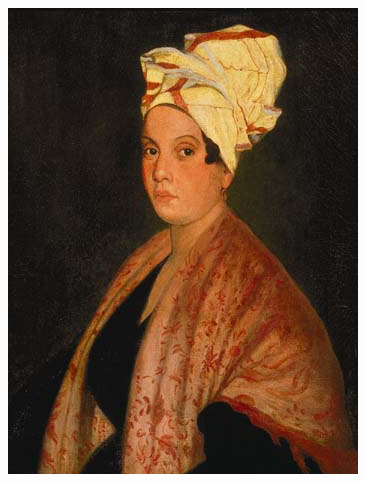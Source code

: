 \documentclass{beamer}
\begin{document}
\begin{frame}{}
\begin{columns}
{            \includegraphics[scale=0.25]{laveau.png}
          }
      \end{columns}
    \end{frame}
\end{document}
